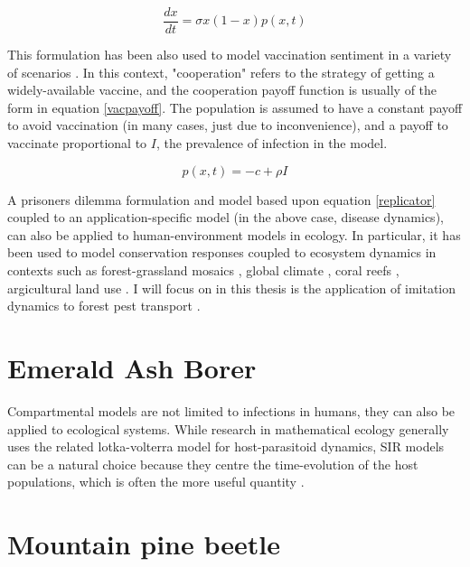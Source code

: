 \begin{equation}
    \frac{dx}{dt} = \sigma x(1 - x)p(x,t) 
    \label{replicator}
\end{equation}


This formulation has been also used to model vaccination sentiment in a variety of scenarios \cite{oraby2014influence,bauch2004vaccination,bauch2005imitation,bauch2012evolutionary}. In this context, "cooperation" refers to the strategy of getting a widely-available vaccine, and the cooperation payoff function is usually of the form in equation \ref{vacpayoff}. The population is assumed to have a constant payoff to avoid vaccination (in many cases, just due to inconvenience), and a payoff to vaccinate proportional to $I$, the prevalence of infection in the model. 

\begin{equation}
    p(x,t) = - c + \rho I
    \label{vacpayoff}
\end{equation}


A prisoners dilemma formulation and model based upon equation \ref{replicator} coupled to an application-specific model (in the above case, disease dynamics), can also be applied to human-environment models in ecology. In particular, it has been used to model conservation responses coupled to ecosystem dynamics in contexts such as forest-grassland mosaics \cite{innes2013impact,henderson2016alternative}, global climate \cite{bury2019charting}, coral reefs \cite{thampi2018socio}, argicultural land use \cite{gooding2018forest}. I will focus on in this thesis is the application of imitation dynamics to forest pest transport \cite{barlow2014modelling,}.



\section{Emerald Ash Borer}

Compartmental models are not limited to infections in humans, they can also be applied to ecological systems. While research in mathematical ecology generally uses the related lotka-volterra model for host-parasitoid dynamics, SIR models can be a natural choice because they centre the time-evolution of the host populations, which is often the more useful quantity \cite{edelstein2005mathematical}. 


\section{Mountain pine beetle}


